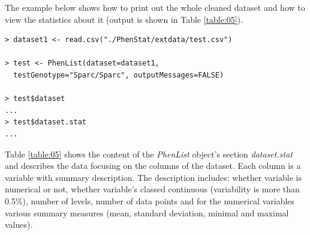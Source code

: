 \documentclass[12pt,a4paper]{article}
\begin{document}
The example below shows how to print out the whole cleaned dataset and how to view the statistics about it (output is shown in Table \ref{table:05}). 
\begingroup
    \fontsize{8pt}{12pt}\selectfont
\begin{verbatim}
> dataset1 <- read.csv("./PhenStat/extdata/test.csv")

> test <- PhenList(dataset=dataset1,
  testGenotype="Sparc/Sparc", outputMessages=FALSE)

> test$dataset
...
> test$dataset.stat
...
\end{verbatim}
\endgroup
Table \ref{table:05} shows the content of the \textit{PhenList} object's section \textit{dataset.stat}  and describes the data focusing on the columns of the dataset. Each column is a variable with summary description. 
The description includes: whether variable is numerical or not, whether variable's classed continuous (variability is more than 0.5\%), number of levels, number of data points and for the numerical variables various summary measures (mean, standard deviation, minimal and maximal values).
\end{document}
